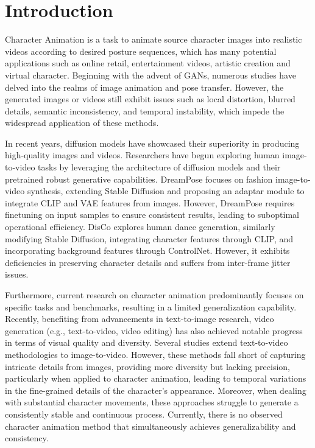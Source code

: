 \section{Introduction}

Character Animation is a task to animate source character images into realistic videos according to desired posture sequences, which has many potential applications such as online retail, entertainment videos, artistic creation and virtual character. Beginning with the advent of GANs\cite{gan,wgan,stylegan}, numerous studies have delved into the realms of image animation and pose transfer\cite{fomm,mraa,ren2020deep,tpsmm,siarohin2019animating,zhang2022exploring,bidirectionally,everybody}. However, the generated images or videos still exhibit issues such as local distortion, blurred details, semantic inconsistency, and temporal instability, which impede the widespread application of these methods.

In recent years, diffusion models\cite{denoising} have showcased their superiority in producing high-quality images and videos. Researchers have begun exploring human image-to-video tasks by leveraging the architecture of diffusion models and their pretrained robust generative capabilities. DreamPose\cite{dreampose} focuses on fashion image-to-video synthesis, extending Stable Diffusion\cite{ldm} and proposing an adaptar module to integrate CLIP\cite{clip} and VAE\cite{vae} features from images. However, DreamPose requires finetuning on input samples to ensure consistent results, leading to suboptimal operational efficiency. DisCo\cite{disco} explores human dance generation, similarly modifying Stable Diffusion, integrating character features through CLIP, and incorporating background features through ControlNet\cite{controlnet}. However, it exhibits deficiencies in preserving character details and suffers from inter-frame jitter issues. 

Furthermore, current research on character animation predominantly focuses on specific tasks and benchmarks, resulting in a limited generalization capability. 
Recently, benefiting from advancements in text-to-image research\cite{dalle2,glide,imagen,ldm,composer,ediffi}, video generation (e.g., text-to-video, video editing)\cite{animatediff,cogvideo,fatezero,imagenvideo,text2videozero,tuneavideo,videocomposer,align,gen1,makeavideo,vdm} has also achieved notable progress in terms of visual quality and diversity.
Several studies extend text-to-video methodologies to image-to-video\cite{videocomposer,videocrafter1,i2vgen,animatediff}. 
However, these methods fall short of capturing intricate details from images, providing more diversity but lacking precision, particularly when applied to character animation, leading to temporal variations in the fine-grained details of the character's appearance. Moreover, when dealing with substantial character movements, these approaches struggle to generate a consistently stable and continuous process. 
Currently, there is no observed character animation method that simultaneously achieves generalizability and consistency.

